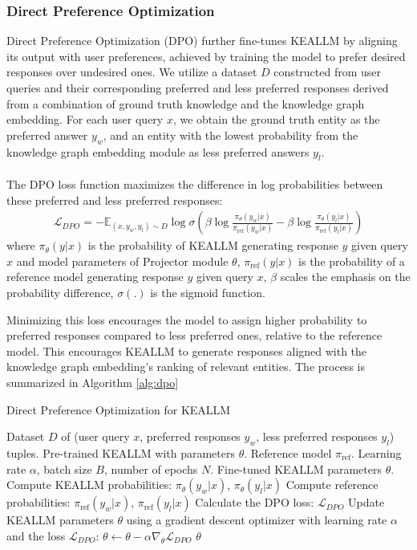 \subsubsection{Direct Preference Optimization}
Direct Preference Optimization (DPO) further fine-tunes KEALLM by aligning its output with user preferences, achieved by training the model to prefer desired responses over undesired ones. We utilize a dataset $D$ constructed from user queries and their corresponding preferred and less preferred responses derived from a combination of ground truth knowledge and the knowledge graph embedding. For each user query $x$, we obtain the ground truth entity as the preferred answer $y_w$, and an entity with the lowest probability from the knowledge graph embedding module as less preferred answers $y_l$.\\\\
The DPO loss function maximizes the difference in log probabilities between these preferred and less preferred responses:
\begin{align}
\mathcal{L}_{DPO} = -\mathbb{E}_{(x, y_w, y_l) \sim D} \log \sigma \left( \beta \log \frac{\pi_{\theta}(y_w | x)}{\pi_{\text{ref}}(y_w | x)} - \beta \log \frac{\pi_{\theta}(y_l | x)}{\pi_{\text{ref}}(y_l | x)} \right)
\end{align}
where $\pi_{\theta}(y | x)$ is the probability of KEALLM generating response $y$ given query $x$ and model parameters of Projector module $\theta$, $\pi_{\text{ref}}(y | x)$ is the probability of a reference model generating response $y$ given query $x$, $\beta$ scales the emphasis on the probability difference, $\sigma(.)$ is the sigmoid function.

Minimizing this loss encourages the model to assign higher probability to preferred responses compared to less preferred ones, relative to the reference model. This encourages KEALLM to generate responses aligned with the knowledge graph embedding's ranking of relevant entities. The process is summarized in Algorithm \ref{alg:dpo}

\begin{algorithm}[hbt]
\caption{Direct Preference Optimization for KEALLM}\label{alg:dpo}
\begin{algorithmic}[1]
\REQUIRE Dataset $D$ of (user query $x$, preferred responses $y_w$, less preferred responses $y_l$) tuples.
\REQUIRE Pre-trained KEALLM with parameters $\theta$.
\REQUIRE Reference model $\pi_{\text{ref}}$.
\REQUIRE Learning rate $\alpha$, batch size $B$, number of epochs $N$.
\ENSURE Fine-tuned KEALLM parameters $\theta$.
\STATE Compute KEALLM probabilities: $\pi_\theta(y_w | x)$, $\pi_\theta(y_l | x)$
\STATE Compute reference probabilities: $\pi_{\text{ref}}(y_w | x)$, $\pi_{\text{ref}}(y_l | x)$
\STATE Calculate the DPO loss: $\mathcal{L}_{DPO}$
\STATE Update KEALLM parameters $\theta$ using a gradient descent optimizer with learning rate $\alpha$ and the loss $\mathcal{L}_{DPO}$:
$\theta \leftarrow \theta - \alpha \nabla_\theta \mathcal{L}_{DPO}$
\ENDFOR
\ENDFOR
\RETURN $\theta$
\end{algorithmic}
\end{algorithm}